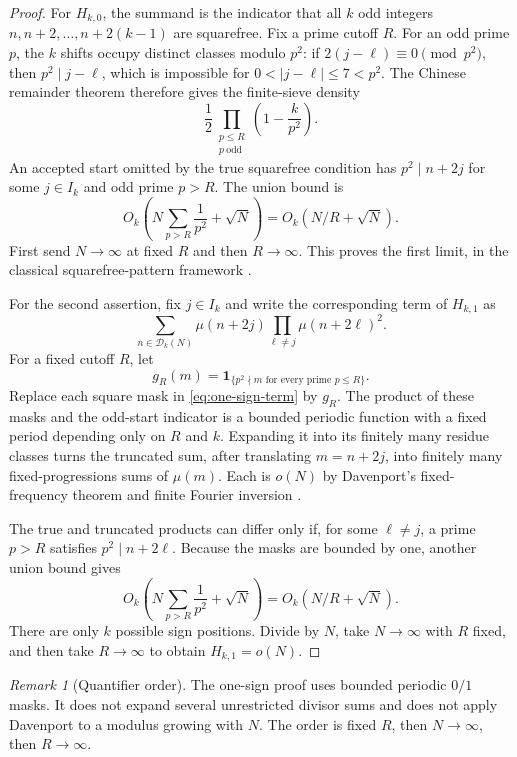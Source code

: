 \documentclass[11pt]{article}
\theoremstyle{definition}
\theoremstyle{remark}
\newtheorem{remark}[theorem]{Remark}
\newcommand{\Mob}{\mu}
\newcommand{\one}{\mathbf 1}
\begin{document}
\begin{proof}
For $H_{k,0}$, the summand is the indicator that all $k$ odd integers
$n,n+2,\ldots,n+2(k-1)$ are squarefree.  Fix a prime cutoff $R$.  For an
odd prime $p$, the $k$ shifts occupy distinct classes modulo $p^2$: if
$2(j-\ell)\equiv0\pmod{p^2}$, then $p^2\mid j-\ell$, which is impossible
for $0<|j-\ell|\le7<p^2$.  The Chinese remainder theorem therefore gives
the finite-sieve density
\[
 \frac12\prod_{\substack{p\le R\\p\ \mathrm{odd}}}
 \left(1-\frac{k}{p^2}\right).
\]
An accepted start omitted by the true squarefree condition has
$p^2\mid n+2j$ for some $j\in I_k$ and odd prime $p>R$.  The union bound is
\[
 O_k\!\left(N\sum_{p>R}\frac1{p^2}+\sqrt N\right)
 =O_k(N/R+\sqrt N).
\]
First send $N\to\infty$ at fixed $R$ and then $R\to\infty$.  This proves
the first limit, in the classical squarefree-pattern framework
\cite{Mirsky1948}.

For the second assertion, fix $j\in I_k$ and write the corresponding term
of $H_{k,1}$ as
\begin{equation}
 \sum_{n\in\mathcal D_k(N)}\Mob(n+2j)
       \prod_{\ell\ne j}\Mob(n+2\ell)^2.
 \label{eq:one-sign-term}
\end{equation}
For a fixed cutoff $R$, let
\[
 g_R(m)=\one_{\{p^2\nmid m\text{ for every prime }p\le R\}}.
\]
Replace each square mask in \eqref{eq:one-sign-term} by $g_R$.  The product
of these masks and the odd-start indicator is a bounded periodic function
with a fixed period depending only on $R$ and $k$.  Expanding it into its
finitely many residue classes turns the truncated sum, after translating
$m=n+2j$, into finitely many fixed-progressions sums of $\Mob(m)$.  Each is
$o(N)$ by Davenport's fixed-frequency theorem and finite Fourier inversion
\cite{Davenport1937}.

The true and truncated products can differ only if, for some
$\ell\ne j$, a prime $p>R$ satisfies $p^2\mid n+2\ell$.  Because the masks
are bounded by one, another union bound gives
\[
 O_k\!\left(N\sum_{p>R}\frac1{p^2}+\sqrt N\right)
 =O_k(N/R+\sqrt N).
\]
There are only $k$ possible sign positions.  Divide by $N$, take
$N\to\infty$ with $R$ fixed, and then take $R\to\infty$ to obtain
$H_{k,1}=o(N)$.
\end{proof}

\begin{remark}[Quantifier order]
The one-sign proof uses bounded periodic $0/1$ masks.  It does not expand
several unrestricted divisor sums and does not apply Davenport to a modulus
growing with $N$.  The order is fixed $R$, then $N\to\infty$, then
$R\to\infty$.
\end{remark}
\end{document}
